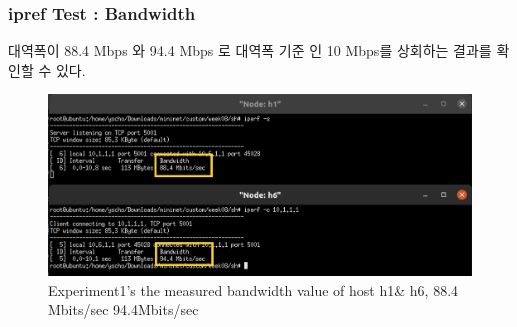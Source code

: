         \subsubsection*{ipref Test : Bandwidth}
        대역폭이 88.4 Mbps 와 94.4 Mbps 로  대역폭 기준 인 10 Mbps를 상회하는 결과를 확인할 수 있다. 
        \begin{figure}[!h]\centering 
        	\includegraphics[width=.88\textwidth]{image/week08/e1-3.png}
        	\caption{\footnotesize
        	 Experiment1's the measured bandwidth value of host h1\& h6, 88.4 Mbits/sec 94.4Mbits/sec}
        	\vspace{-10pt}
        \end{figure}
